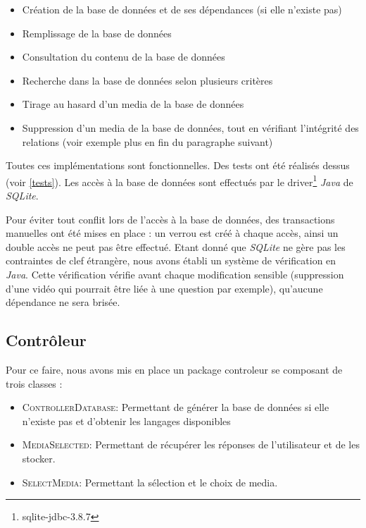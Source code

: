 \begin{itemize}
 \item Création de la base de données et de ses dépendances (si elle n'existe pas)
 \item Remplissage de la base de données
 \item Consultation du contenu de la base de données
 \item Recherche dans la base de données selon plusieurs critères
 \item Tirage au hasard d'un media de la base de données
 \item Suppression d'un media de la base de données, tout en vérifiant l'intégrité des relations (voir exemple plus en fin du paragraphe suivant)
\end{itemize}


Toutes ces implémentations sont fonctionnelles. Des tests ont été réalisés dessus (voir \ref{tests}).
Les accès à la base de données sont effectués par le driver\footnote{sqlite-jdbc-3.8.7} \textit{Java} de \textit{SQLite}.

Pour éviter tout conflit lors de l'accès à la base de données, des transactions manuelles ont été mises en place : un verrou est créé à chaque accès, ainsi un double accès ne peut pas être effectué.
Etant donné que \textit{SQLite} ne gère pas les contraintes de clef étrangère, nous avons établi un système de vérification en \textit{Java}. Cette vérification vérifie avant chaque modification sensible (suppression d'une vidéo qui pourrait être liée à une question par exemple), qu'aucune dépendance ne sera brisée.


\subsection{Contrôleur}\label{controller}



Pour ce faire, nous avons mis en place un package controleur se composant de trois classes :

\begin{itemize}
  \item \textsc{ControllerDatabase}: Permettant de générer la base de données si elle n'existe pas et d'obtenir les langages disponibles
  \item \textsc{MediaSelected}: Permettant de récupérer les réponses de l'utilisateur et de les stocker.
  \item \textsc{SelectMedia}: Permettant la sélection et le choix de media.
\end{itemize}

